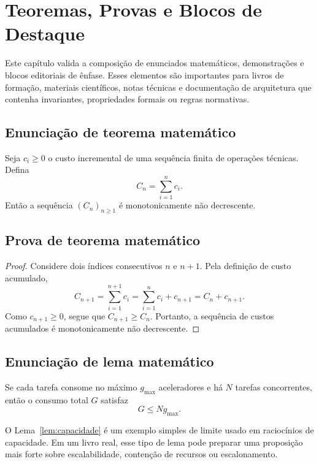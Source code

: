 
\chapter{Teoremas, Provas e Blocos de Destaque}

Este capítulo valida a composição de enunciados matemáticos, demonstrações e blocos editoriais de ênfase. Esses elementos são importantes para livros de formação, materiais científicos, notas técnicas e documentação de arquitetura que contenha invariantes, propriedades formais ou regras normativas.

\section{Enunciação de teorema matemático}

\begin{theorem}
\label{thm:monotonicidade}
Seja $c_i \geq 0$ o custo incremental de uma sequência finita de operações técnicas. Defina
\[
C_n = \sum_{i=1}^{n} c_i.
\]
Então a sequência $(C_n)_{n\geq 1}$ é monotonicamente não decrescente.
\end{theorem}

\section{Prova de teorema matemático}

\begin{proof}
Considere dois índices consecutivos $n$ e $n+1$. Pela definição de custo acumulado,
\[
C_{n+1}=\sum_{i=1}^{n+1}c_i = \sum_{i=1}^{n}c_i + c_{n+1}=C_n+c_{n+1}.
\]
Como $c_{n+1}\geq 0$, segue que $C_{n+1}\geq C_n$. Portanto, a sequência de custos acumulados é monotonicamente não decrescente.
\end{proof}

\section{Enunciação de lema matemático}

\begin{lemma}
\label{lem:capacidade}
Se cada tarefa consome no máximo $g_{\max}$ aceleradores e há $N$ tarefas concorrentes, então o consumo total $G$ satisfaz
\[
G \leq N g_{\max}.
\]
\end{lemma}

O Lema~\ref{lem:capacidade} é um exemplo simples de limite usado em raciocínios de capacidade. Em um livro real, esse tipo de lema pode preparar uma proposição mais forte sobre escalabilidade, contenção de recursos ou escalonamento.

